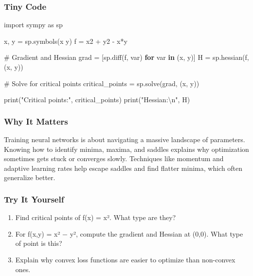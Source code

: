 \documentclass[
  letterpaper,
  DIV=11,
  numbers=noendperiod]{scrreprt}
\newenvironment{Shaded}{\begin{snugshade}}{\end{snugshade}}
\newcommand{\BuiltInTok}[1]{\textcolor[rgb]{0.00,0.23,0.31}{#1}}
\newcommand{\CharTok}[1]{\textcolor[rgb]{0.13,0.47,0.30}{#1}}
\newcommand{\CommentTok}[1]{\textcolor[rgb]{0.37,0.37,0.37}{#1}}
\newcommand{\ControlFlowTok}[1]{\textcolor[rgb]{0.00,0.23,0.31}{\textbf{#1}}}
\newcommand{\ImportTok}[1]{\textcolor[rgb]{0.00,0.46,0.62}{#1}}
\newcommand{\KeywordTok}[1]{\textcolor[rgb]{0.00,0.23,0.31}{\textbf{#1}}}
\newcommand{\NormalTok}[1]{\textcolor[rgb]{0.00,0.23,0.31}{#1}}
\newcommand{\OperatorTok}[1]{\textcolor[rgb]{0.37,0.37,0.37}{#1}}
\newcommand{\StringTok}[1]{\textcolor[rgb]{0.13,0.47,0.30}{#1}}
\providecommand{\tightlist}{%
  \setlength{\itemsep}{0pt}\setlength{\parskip}{0pt}}
\begin{document}
\subsubsection{Tiny Code}\label{tiny-code-115}

\begin{Shaded}
\begin{Highlighting}[]
\ImportTok{import}\NormalTok{ sympy }\ImportTok{as}\NormalTok{ sp}

\NormalTok{x, y }\OperatorTok{=}\NormalTok{ sp.symbols(}\StringTok{\textquotesingle{}x y\textquotesingle{}}\NormalTok{)}
\NormalTok{f }\OperatorTok{=}\NormalTok{ x2 }\OperatorTok{+}\NormalTok{ y2 }\OperatorTok{{-}}\NormalTok{ x}\OperatorTok{*}\NormalTok{y}

\CommentTok{\# Gradient and Hessian}
\NormalTok{grad }\OperatorTok{=}\NormalTok{ [sp.diff(f, var) }\ControlFlowTok{for}\NormalTok{ var }\KeywordTok{in}\NormalTok{ (x, y)]}
\NormalTok{H }\OperatorTok{=}\NormalTok{ sp.hessian(f, (x, y))}

\CommentTok{\# Solve for critical points}
\NormalTok{critical\_points }\OperatorTok{=}\NormalTok{ sp.solve(grad, (x, y))}

\BuiltInTok{print}\NormalTok{(}\StringTok{"Critical points:"}\NormalTok{, critical\_points)}
\BuiltInTok{print}\NormalTok{(}\StringTok{"Hessian:}\CharTok{\textbackslash{}n}\StringTok{"}\NormalTok{, H)}
\end{Highlighting}
\end{Shaded}

\subsubsection{Why It Matters}\label{why-it-matters-13}

Training neural networks is about navigating a massive landscape of
parameters. Knowing how to identify minima, maxima, and saddles explains
why optimization sometimes gets stuck or converges slowly. Techniques
like momentum and adaptive learning rates help escape saddles and find
flatter minima, which often generalize better.

\subsubsection{Try It Yourself}\label{try-it-yourself-115}

\begin{enumerate}
\def\labelenumi{\arabic{enumi}.}
\tightlist
\item
  Find critical points of f(x) = x². What type are they?
\item
  For f(x,y) = x² − y², compute the gradient and Hessian at (0,0). What
  type of point is this?
\item
  Explain why convex loss functions are easier to optimize than
  non-convex ones.
\end{enumerate}
\end{document}
